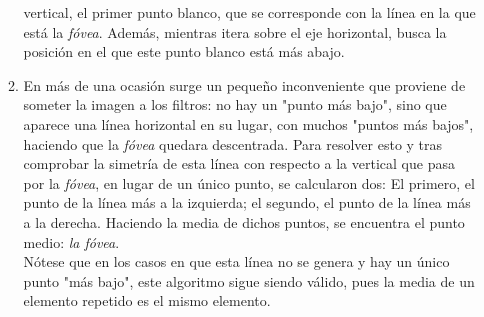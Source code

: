\begin{enumerate}
\begin{enumerate}[label*=\arabic*.]
    vertical, el primer punto blanco, que se corresponde con la línea 
    en la que está la \emph{fóvea}. Además, mientras itera sobre el 
    eje horizontal, busca la posición en el que este punto blanco 
    está más abajo.
  \item En más de una ocasión surge un pequeño inconveniente que 
    proviene de someter la imagen a los filtros: no hay un "punto
    más bajo", sino que aparece una línea horizontal en su lugar, 
    con muchos "puntos más bajos", haciendo que la \emph{fóvea} quedara 
    descentrada. Para resolver esto y tras comprobar la simetría de 
    esta línea con respecto a la vertical que pasa por la \emph{fóvea},
    en lugar de un único punto, se calcularon dos: El primero, el punto 
    de la línea más a la izquierda; el segundo, el punto de la línea más 
    a la derecha. Haciendo la media de dichos puntos, se encuentra el 
    punto medio: \emph{la fóvea}. \\
    Nótese que en los casos en que esta línea no se genera y hay un único 
    punto "más bajo", este algoritmo sigue siendo válido, pues la media 
    de un elemento repetido es el mismo elemento.
  \end{enumerate}
\end{enumerate}